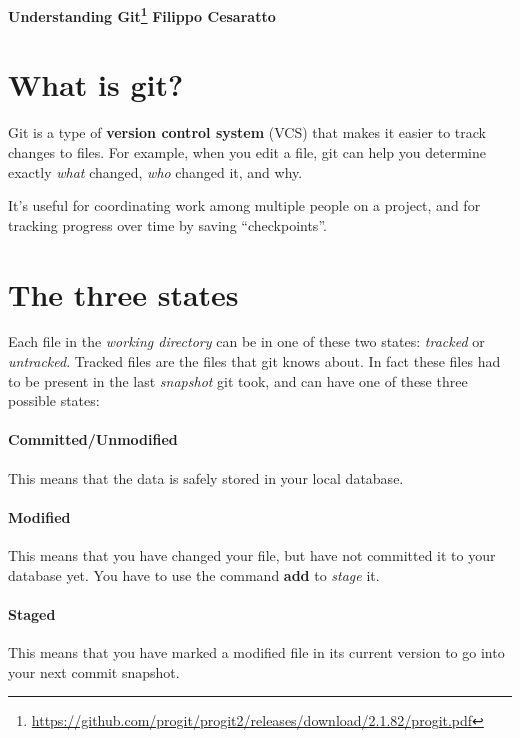\documentclass[a4paper, 12pt]{article}
\begin{document}
\noindent
\large\textbf{Understanding Git\footnote{\url{https://github.com/progit/progit2/releases/download/2.1.82/progit.pdf}}} \hfill \textbf{Filippo Cesaratto} \\
\normalsize

\section*{What is git?}
Git is a type of \textbf{version control system} (VCS) that makes it easier to track changes to files. For example, when you edit a file, git can help you determine exactly \emph{what} changed, \emph{who} changed it, and why.

It's useful for coordinating work among multiple people on a project, and for tracking progress over time by saving ``checkpoints''. 

\section*{The three states}
Each file in the \emph{working directory} can be in one of these two states: \emph{tracked} or \emph{untracked}. Tracked files are the files that git knows about. In fact these files had to be present in the last \emph{snapshot} git took, and can have one of these three possible states:
\paragraph{Committed/Unmodified} This means that the data is safely stored in your local database.
\paragraph{Modified} This means that you have changed your file, but have not committed it to your database yet. You have to use the command \textbf{add} to \emph{stage} it.
\paragraph{Staged} This means that you have marked a modified file in its current version to go into your next commit snapshot.
\end{document}
